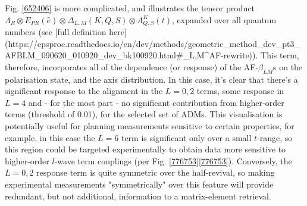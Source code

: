 Fig. \ref{652406} is more complicated, and illustrates the tensor product $\Lambda_{R}\otimes E_{PR}(\hat{e})\otimes \Delta_{L,M}(K,Q,S)\otimes A^{K}_{Q,S}(t)$, expanded over all quantum numbers (see [full definition here](https://epsproc.readthedocs.io/en/dev/methods/geometric_method_dev_pt3_AFBLM_090620_010920_dev_bk100920.html#\beta_{L,M}^{AF}-rewrite)). This term, therefore, incorporates all of the dependence (or response) of the AF-$\beta_{LM}$s on the polarisation state, and the axis distribution. In this case, it's clear that there's a significant response to the alignment in the $L=0,2$ terms, some response in $L=4$ and - for the most part - no significant contribution from higher-order terms (threshold of 0.01), for the selected set of ADMs. This visualisation is potentially useful for planning measurements sensitive to certain properties, for example, in this case the $L=6$ term is significant only over a small $t$-range, so this region could be targeted experimentally to obtain data more sensitive to higher-order $l$-wave term couplings (per Fig. \ref{776753}\ref{776753}). Conversely, the $L=0,2$ response term is quite symmetric over the half-revival, so making experimental measurements "symmetrically" over this feature will provide redundant, but not additional, information to a matrix-element retrieval.
